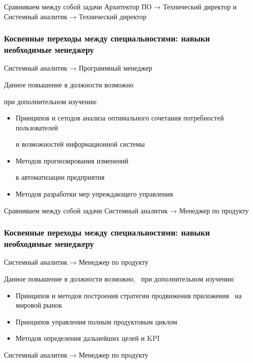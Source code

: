 \documentclass{../industrial-development}
\begin{document}
\lecturenotes
Сравниваем между собой задачи Архитектор ПО  → Технический директор  и
Системный аналитик → Технический директор


\begin{frame} \frametitle{Косвенные переходы между специальностями: навыки необходимые менеджеру}

\begin{block}{Системный аналитик → Программный менеджер}

Данное повышение в должности возможно 

при дополнительном изучении:
  \end{block}
\begin{itemize}
\item Принципов и сетодов анализа оптимального сочетания потребностей пользователей 

и возможностей информационной системы
\item Методов прогнозирования изменений 

в автоматизации предприятия
 \item Методов разработки мер упреждающего управления
\end{itemize}

\end{frame}

\lecturenotes

Сравниваем между собой задачи Системный аналитик → Менеджер по продукту 

\begin{frame} \frametitle{Косвенные переходы между специальностями: навыки необходимые менеджеру}

\begin{block}{Системный аналитик → Менеджер по продукту  }

Данное повышение в должности возможно, ~при дополнительном изучении:
  \end{block}
\begin{itemize}
\item Принципов и методов построения стратегии продвижения приложения ~на мировой рынок
\item Принципов управления полным продуктовым циклом
\item Методов определения дальнейших целей и KPI
\end{itemize}

\end{frame}

\lecturenotes

Системный аналитик → Менеджер по продукту
\end{document}
